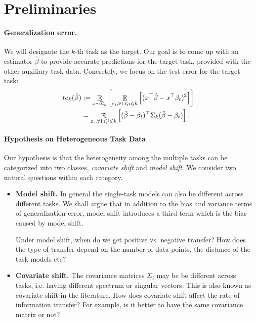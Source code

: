 \section{Preliminaries}

\paragraph{Generalization error.}
We will designate the $k$-th task as the target.
Our goal is to come up with an estimator $\hat{\beta}$ to provide accurate predictions for the target task, provided with the other auxiliary task data.
Concretely, we focus on the test error for the target task:
		\begin{align*}
			te_k(\hat{\beta}) &:= \mathop{\mathbb{E}}_{x \sim \Sigma_k}\left[ \mathop{\mathbb{E}}_{{\varepsilon_i, \forall 1\leqslant i\leqslant k}}\left[ (x^{\top}\hat{\beta} - x^{\top}\beta_t)^2 \right] \right] \\
			&= \mathop{\mathbb{E}}_{\varepsilon_i, \forall 1\leqslant i\leqslant k}\left[ (\hat{\beta} - \beta_t)^{\top}\Sigma_k(\hat{\beta} - \beta_t) \right].
		\end{align*}

\paragraph{Hypothesis on Heterogeneous Task Data}

Our hypothesis is that the heterogeneity among the multiple tasks can be categorized into two classes, \textit{covariate shift} and \textit{model shift}. %
We consider two natural questions within each category.
\begin{itemize}
	\item \textbf{Model shift.}
	In general the single-task models can also be different across different tasks.
We shall argue that in addition to the bias and variance terms of generalization error, model shift introduces a third term which is the bias caused by model shift.

	Under model shift, when do we get positive vs. negative transfer?
	How does the type of transfer depend on the number of data points, the distance of the task models etc?
	\item \textbf{Covariate shift.}
	The covariance matrices $\Sigma_i$ may be be different across tasks, i.e. having different spectrum or singular vectors.
This is also known as covariate shift in the literature.
	How does covariate shift affect the rate of information transfer?
	For example, is it better to have the same covariance matrix or not?
\end{itemize}



